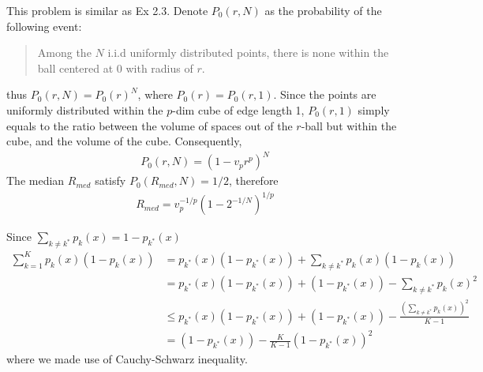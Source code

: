 \begin{exercise}
  This problem is similar as Ex 2.3. Denote $P_0(r, N)$ as the probability of
  the following event:
  \blockquote{Among the $N$ i.i.d uniformly distributed points, there is none
  within the ball centered at 0 with radius of $r$.}
  thus $P_0(r, N) = P_0(r)^N$, where $P_0(r) = P_0(r, 1)$. Since the points are
  uniformly distributed within the $p$-dim cube of edge length 1, $P_0(r, 1)$
  simply equals to the ratio between the volume of spaces out of the $r$-ball
  but within the cube, and the volume of the cube. Consequently,
  \begin{align}
    P_0(r, N) = (1 - v_pr^p)^N
  \end{align}
  The median $R_{med}$ satisfy $P_0(R_{med}, N) = 1 /2$, therefore
  \begin{align}
    R_{med} = v_p^{-1/p}(1-2^{-1/N})^{1/p}
  \end{align}
\end{exercise}

\begin{exercise}
  Since $\sum_{k\not=k^*}p_k(x) = 1 - p_{k^*}(x)$
  \begin{align}
    \sum_{k=1}^{K} p_{k}(x)\left(1-p_{k}(x)\right) &=p_{k^{*}}(x)\left(1-p_{k^{*}}(x)\right)+\sum_{k \neq k^{*}} p_{k}(x)\left(1-p_{k}(x)\right) \\ 
    &=p_{k^{*}}(x)\left(1-p_{k^{*}}(x)\right)+\left(1-p_{k^{*}}(x)\right)-\sum_{k \neq k^{*}} p_{k}(x)^{2} \\ 
    & \leq p_{k^{*}}(x)\left(1-p_{k^{*}}(x)\right)+\left(1-p_{k^{*}}(x)\right)-\frac{\left(\sum_{k \neq k^{*}} p_{k}(x)\right)^{2}}{K-1} \\ 
    &=\left(1-p_{k^{*}}(x)\right)-\frac{K}{K-1}\left(1-p_{k^{*}}(x)\right)^{2}
  \end{align}
  where we made use of Cauchy-Schwarz inequality.
\end{exercise}

